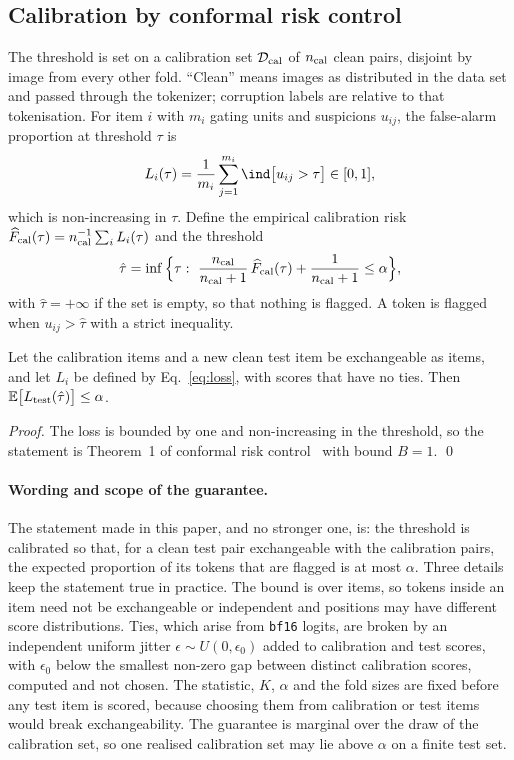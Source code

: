 \subsection{Calibration by conformal risk control}\label{ssec:calibration}
The threshold is set on a calibration set $\mathcal D_{\rm cal}$ of $n_{\rm cal}$ clean pairs, disjoint by image from every other fold.
``Clean'' means images as distributed in the data set and passed through the tokenizer; corruption labels are relative to
that tokenisation.
For item $i$ with $m_i$ gating units and suspicions $u_{ij}$, the false-alarm proportion at threshold $\tau$ is
\begin{equation}
L_i(\tau)=\frac1{m_i}\sum_{j=1}^{m_i}\ind\big[u_{ij}>\tau\big]\in[0,1],
\label{eq:loss}
\end{equation}
which is non-increasing in $\tau$.
Define the empirical calibration risk $\widehat F_{\rm cal}(\tau)=n_{\rm cal}^{-1}\sum_i L_i(\tau)$ and the threshold
\begin{equation}
\hat\tau=\inf\Big\{\tau:\ \frac{n_{\rm cal}}{n_{\rm cal}+1}\,\widehat F_{\rm cal}(\tau)+\frac1{n_{\rm cal}+1}\le\alpha\Big\},
\label{eq:crc}
\end{equation}
with $\hat\tau=+\infty$ if the set is empty, so that nothing is flagged.
A token is flagged when $u_{ij}>\hat\tau$ with a strict inequality.

\begin{proposition}\label{prop:crc}
Let the calibration items and a new clean test item be exchangeable as items, and let $L_i$ be defined by
Eq.~\eqref{eq:loss}, with scores that have no ties.
Then $\mathbb{E}\big[L_{\rm test}(\hat\tau)\big]\le\alpha$.
\end{proposition}
\noindent\emph{Proof.} The loss is bounded by one and non-increasing in the threshold, so the statement is Theorem~1 of
conformal risk control~\citep{angelopoulos2024crc} with bound $B=1$. \qed

\paragraph{Wording and scope of the guarantee.}
The statement made in this paper, and no stronger one, is: the threshold is calibrated so that, for a clean test pair
exchangeable with the calibration pairs, the expected proportion of its tokens that are flagged is at most $\alpha$.
Three details keep the statement true in practice.
The bound is over items, so tokens inside an item need not be exchangeable or independent and positions may have different
score distributions.
Ties, which arise from \texttt{bf16} logits, are broken by an independent uniform jitter $\epsilon\sim U(0,\epsilon_0)$ added to
calibration and test scores, with $\epsilon_0$ below the smallest non-zero gap between distinct calibration scores, computed
and not chosen.
The statistic, $K$, $\alpha$ and the fold sizes are fixed before any test item is scored, because choosing them from calibration
or test items would break exchangeability.
The guarantee is marginal over the draw of the calibration set, so one realised calibration set may lie above $\alpha$ on a
finite test set.

